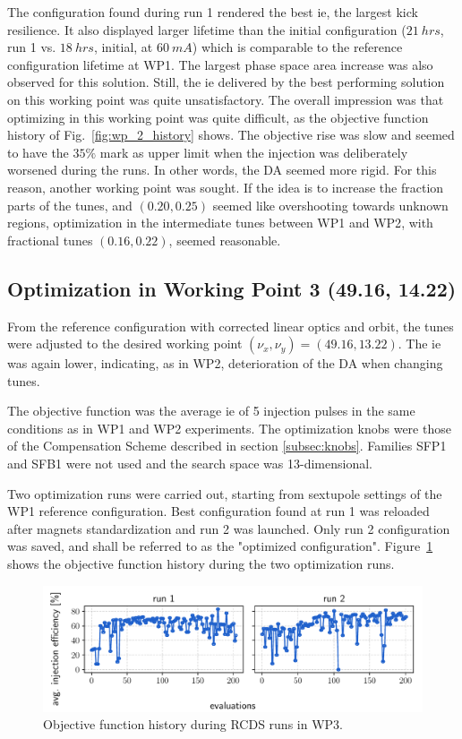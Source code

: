 The configuration found during run 1 rendered the best \gls*{ie}, the largest kick resilience. It also displayed larger lifetime than the initial configuration ($21~\unit{hrs}$, run 1 vs. $18~\unit{hrs}$, initial, at $60~\unit{mA}$) which is comparable to the reference configuration lifetime at \gls*{WP1}. The largest phase space area increase was also observed for this solution. Still, the \gls*{ie} delivered by the best performing solution on this working point was quite unsatisfactory. The overall impression was that optimizing in this working point was quite difficult, as the objective function history of Fig.~\ref{fig:wp_2_history} shows. The objective rise was slow and seemed to have the $35\%$ mark as upper limit when the injection was deliberately worsened during the runs. In other words, the \gls*{DA} seemed more rigid. For this reason, another working point was sought. If the idea is to increase the fraction parts of the tunes, and $(0.20, 0.25)$ seemed like overshooting towards unknown regions, optimization in the intermediate tunes between \gls*{WP1} and \gls*{WP2}, with fractional tunes $(0.16, 0.22)$, seemed reasonable.
\subsection{Optimization in Working Point 3 (49.16, 14.22)}
From the reference configuration with corrected linear optics and orbit, the tunes were adjusted to the desired working point $(\nu_x, \nu_y)=(49.16, 13.22)$. The \gls*{ie} was again lower, indicating, as in \gls*{WP2}, deterioration of the \gls*{DA} when changing tunes.

The objective function was the average \gls*{ie} of 5 injection pulses in the same conditions as in \gls*{WP1} and \gls*{WP2} experiments. The optimization knobs were those of the Compensation Scheme described in section \ref{subsec:knobs}. Families SFP1 and SFB1 were not used and the search space was 13-dimensional.

Two optimization runs were carried out, starting from sextupole settings of the \gls*{WP1} reference configuration. Best configuration found at run 1 was reloaded after magnets standardization and run 2 was launched. Only run 2 configuration was saved, and shall be referred to as the "optimized configuration". Figure~\ref{fig:wp3_history} shows the objective function history during the two optimization runs.
\begin{figure}[htb]
    \centering
    \includegraphics[width=\columnwidth]{Images/wp3_objfunc_hist.pdf}
    \caption[Objective function history during RCDS runs in WP3.]{Objective function history during \gls*{RCDS} runs in \gls*{WP3}.}
    \label{fig:wp3_history}
\end{figure}

